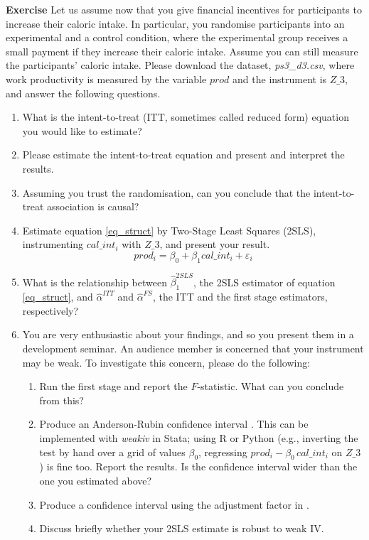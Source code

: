 \documentclass[10pt]{article}
\newcounter{exercise}
\newenvironment{exercise}%
{%
	\refstepcounter{exercise}%
	\textbf{Exercise \theexercise}%
	}%
{
 \par\vspace{\baselineskip}%
\noindent\ignorespacesafterend
}
\begin{document}

\begin{exercise}\label{2sls}
	Let us assume now that you give financial incentives for participants to increase their caloric intake. In particular, you randomise participants into an experimental and a control condition, where the experimental group receives a small payment if they increase their caloric intake. Assume you can still measure the participants' caloric intake. Please download the dataset, \textit{ps3\_d3.csv}, where work productivity is measured by the variable $ prod $ and the instrument is $ Z\_3 $, and answer the following questions.
	\begin{enumerate}
		\item What is the intent-to-treat (ITT, sometimes called reduced form) equation you would like to estimate?
		\item Please estimate the intent-to-treat equation and present and interpret the results.
		\item Assuming you trust the randomisation, can you conclude that the intent-to-treat association is causal?
		\item Estimate equation \ref{eq_struct} by Two-Stage Least Squares (2SLS), instrumenting $ cal\_int_{i} $ with $ Z\_3 $, and present your result.
		\begin{equation}\label{eq_struct}
			prod_{i} = \beta_{0} + \beta_{1} cal\_int_{i} + \varepsilon_{i}
		\end{equation}
		\item What is the relationship between $ \hat{\beta}_{1}^{2SLS} $, the 2SLS estimator of equation \ref{eq_struct}, and $ \hat{\alpha}^{ITT} $ and $ \hat{\alpha}^{FS} $, the ITT and the first stage estimators, respectively?
		\item You are very enthusiastic about your findings, and so you present them in a development seminar. An audience member is concerned that your instrument may be weak. To investigate this concern, please do the following:
		\begin{enumerate}
			\item Run the first stage and report the $F$-statistic. What can you conclude from this?
			\item Produce an Anderson-Rubin confidence interval \citep{anderson1949}. This can be implemented with \textit{weakiv} in Stata; using R or Python (e.g., inverting the test by hand over a grid of values $\beta_0$, regressing $prod_i - \beta_0\, cal\_int_i$ on $Z\_3$) is fine too. Report the results. Is the confidence interval wider than the one you estimated above?
			\item Produce a confidence interval using the adjustment factor in \citet{lee2022}.
			\item Discuss briefly whether your 2SLS estimate is robust to weak IV.
		\end{enumerate}


\end{enumerate}
\end{exercise}
\end{document}

